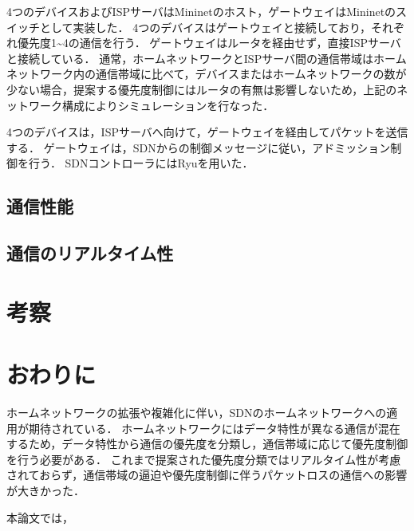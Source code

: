 \documentclass[a4paper,11pt,uplatex]{ujreport}
\begin{document}
4つのデバイスおよびISPサーバはMininetのホスト，ゲートウェイはMininetのスイッチとして実装した．
4つのデバイスはゲートウェイと接続しており，それぞれ優先度1\textasciitilde4の通信を行う．
ゲートウェイはルータを経由せず，直接ISPサーバと接続している．
通常，ホームネットワークとISPサーバ間の通信帯域はホームネットワーク内の通信帯域に比べて，デバイスまたはホームネットワークの数が少ない場合，提案する優先度制御にはルータの有無は影響しないため，上記のネットワーク構成によりシミュレーションを行なった．\par
4つのデバイスは，ISPサーバへ向けて，ゲートウェイを経由してパケットを送信する．
ゲートウェイは，SDNからの制御メッセージに従い，アドミッション制御を行う．
SDNコントローラにはRyu\cite{Ryu}を用いた．

\section{通信性能}
\label{通信性能}

\section{通信のリアルタイム性}
\label{通信のリアルタイム性}


\chapter{考察}
\label{chap:考察}

\chapter{おわりに}
\label{chap:おわりに}


  ホームネットワークの拡張や複雑化に伴い，SDNのホームネットワークへの適用が期待されている．
  ホームネットワークにはデータ特性が異なる通信が混在するため，データ特性から通信の優先度を分類し，通信帯域に応じて優先度制御を行う必要がある．
  これまで提案された優先度分類ではリアルタイム性が考慮されておらず，通信帯域の逼迫や優先度制御に伴うパケットロスの通信への影響が大きかった．\par
  本論文では，
\end{document}
